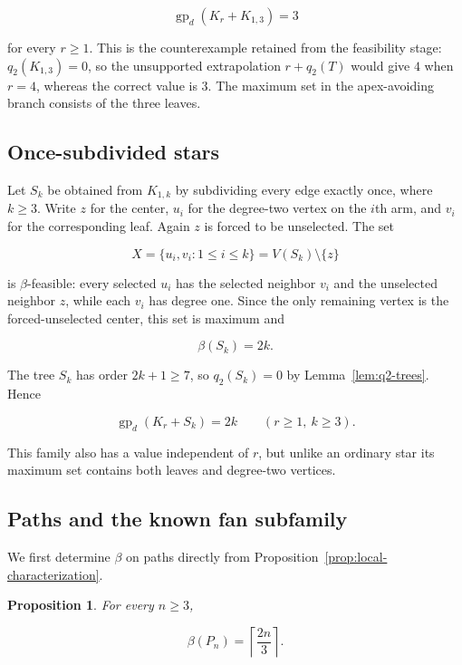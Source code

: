 \documentclass[11pt,a4paper]{article}
\newtheorem{proposition}[theorem]{Proposition}
\numberwithin{equation}{section}
\begin{document}
\[
\operatorname{gp}_d(K_r+K_{1,3})=3
\]

for every \(r\ge 1\). This is the counterexample retained from the
feasibility stage: \(q_2(K_{1,3})=0\), so the unsupported extrapolation
\(r+q_2(T)\) would give \(4\) when \(r=4\), whereas the correct value is
\(3\). The maximum set in the apex-avoiding branch consists of the three
leaves.

\subsection{Once-subdivided stars}\label{sec:subdivided-stars}

Let \(S_k\) be obtained from \(K_{1,k}\) by subdividing every edge
exactly once, where \(k\ge 3\). Write \(z\) for the center, \(u_i\) for
the degree-two vertex on the \(i\)th arm, and \(v_i\) for the
corresponding leaf. Again \(z\) is forced to be unselected. The set

\[
X=\{u_i,v_i:1\le i\le k\}=V(S_k)\setminus\{z\}
\]

is \(\beta\)-feasible: every selected \(u_i\) has the selected neighbor
\(v_i\) and the unselected neighbor \(z\), while each \(v_i\) has degree
one. Since the only remaining vertex is the forced-unselected center,
this set is maximum and

\[
\beta(S_k)=2k.
\]

The tree \(S_k\) has order \(2k+1\ge 7\), so \(q_2(S_k)=0\) by
Lemma~\ref{lem:q2-trees}. Hence

\begin{equation}\label{eq:subdivided-star-family}
\operatorname{gp}_d(K_r+S_k)=2k
\qquad (r\ge 1,\ k\ge 3).
\end{equation}

This family also has a value independent of \(r\), but unlike an
ordinary star its maximum set contains both leaves and degree-two
vertices.

\subsection{Paths and the known fan subfamily}\label{sec:paths}

We first determine \(\beta\) on paths directly from Proposition~\ref{prop:local-characterization}.

\begin{proposition}\label{prop:beta-path}
For every \(n\ge 3\),

\[
\beta(P_n)=\left\lceil\frac{2n}{3}\right\rceil.
\]
\end{proposition}
\end{document}
